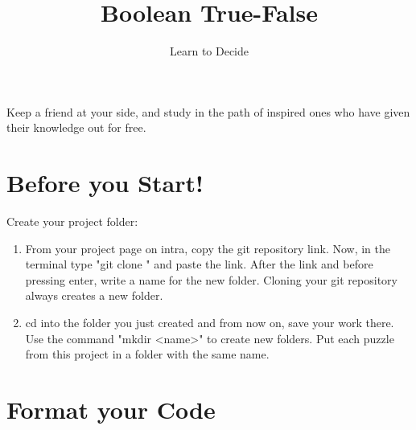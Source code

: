 \documentclass{42-en}
\begin{document}
\title{Boolean True-False}
\subtitle{Learn to Decide}


\summary
{
	Keep a friend at your side, and study in the path of inspired ones who have given their knowledge out for free. 
}

\maketitle

\tableofcontents


\chapter{Before you Start!}

Create your project folder:
	\begin{enumerate}
		\item From your project page on intra, copy the git repository link. Now, in the terminal type "git clone " and paste the link. After the link and before pressing enter, write a name for the new folder. Cloning your git repository always creates a new folder.
		\item cd into the folder you just created and from now on, save your work there. Use the command "mkdir <name>" to create new folders. Put each puzzle from this project in a folder with the same name.
	\end{enumerate}



\chapter{Format your Code}
\end{document}

